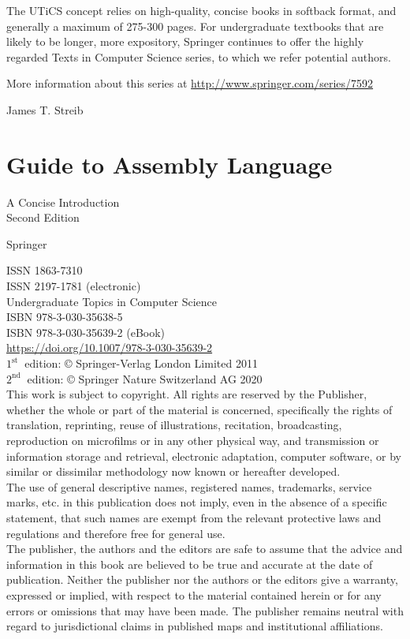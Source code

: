 \documentclass[10pt]{article}
\begin{document}
The UTiCS concept relies on high-quality, concise books in softback format, and generally a maximum of 275-300 pages. For undergraduate textbooks that are likely to be longer, more expository, Springer continues to offer the highly regarded Texts in Computer Science series, to which we refer potential authors.

More information about this series at \href{http://www.springer.com/series/7592}{http://www.springer.com/series/7592}

James T. Streib

\section*{Guide to Assembly Language }
A Concise Introduction\\
Second Edition

Springer

ISSN 1863-7310\\
ISSN 2197-1781 (electronic)\\
Undergraduate Topics in Computer Science\\
ISBN 978-3-030-35638-5\\
ISBN 978-3-030-35639-2 (eBook)\\
\href{https://doi.org/10.1007/978-3-030-35639-2}{https://doi.org/10.1007/978-3-030-35639-2}\\
$1^{\text {st }}$ edition: © Springer-Verlag London Limited 2011\\
$2^{\text {nd }}$ edition: © Springer Nature Switzerland AG 2020\\
This work is subject to copyright. All rights are reserved by the Publisher, whether the whole or part of the material is concerned, specifically the rights of translation, reprinting, reuse of illustrations, recitation, broadcasting, reproduction on microfilms or in any other physical way, and transmission or information storage and retrieval, electronic adaptation, computer software, or by similar or dissimilar methodology now known or hereafter developed.\\
The use of general descriptive names, registered names, trademarks, service marks, etc. in this publication does not imply, even in the absence of a specific statement, that such names are exempt from the relevant protective laws and regulations and therefore free for general use.\\
The publisher, the authors and the editors are safe to assume that the advice and information in this book are believed to be true and accurate at the date of publication. Neither the publisher nor the authors or the editors give a warranty, expressed or implied, with respect to the material contained herein or for any errors or omissions that may have been made. The publisher remains neutral with regard to jurisdictional claims in published maps and institutional affiliations.
\end{document}
